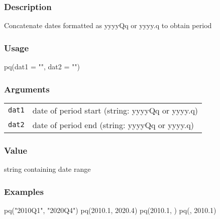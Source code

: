 \documentclass[
  letterpaper,
  DIV=11,
  numbers=noendperiod]{scrreport}
\newenvironment{Shaded}{\begin{snugshade}}{\end{snugshade}}
\newcommand{\AttributeTok}[1]{\textcolor[rgb]{0.40,0.45,0.13}{#1}}
\newcommand{\FloatTok}[1]{\textcolor[rgb]{0.68,0.00,0.00}{#1}}
\newcommand{\FunctionTok}[1]{\textcolor[rgb]{0.28,0.35,0.67}{#1}}
\newcommand{\NormalTok}[1]{\textcolor[rgb]{0.00,0.23,0.31}{#1}}
\newcommand{\StringTok}[1]{\textcolor[rgb]{0.13,0.47,0.30}{#1}}
\begin{document}
\subsubsection{Description}\label{description-21}

Concatenate dates formatted as yyyyQq or yyyy.q to obtain period

\subsubsection{Usage}\label{usage-21}

\begin{Shaded}
\begin{Highlighting}[]
\FunctionTok{pq}\NormalTok{(}\AttributeTok{dat1 =} \StringTok{""}\NormalTok{, }\AttributeTok{dat2 =} \StringTok{""}\NormalTok{)}
\end{Highlighting}
\end{Shaded}

\subsubsection{Arguments}\label{arguments-21}

\begin{longtable}[]{@{}ll@{}}
\toprule\noalign{}
\endhead
\bottomrule\noalign{}
\endlastfoot
\texttt{dat1} & date of period start (string: yyyyQq or yyyy.q) \\
\texttt{dat2} & date of period end (string: yyyyQq or yyyy.q) \\
\end{longtable}

\subsubsection{Value}\label{value-21}

string containing date range

\subsubsection{Examples}\label{examples-21}

\begin{Shaded}
\begin{Highlighting}[]
\FunctionTok{pq}\NormalTok{(}\StringTok{"2010Q1"}\NormalTok{, }\StringTok{"2020Q4"}\NormalTok{)}
\FunctionTok{pq}\NormalTok{(}\FloatTok{2010.1}\NormalTok{, }\FloatTok{2020.4}\NormalTok{)}
\FunctionTok{pq}\NormalTok{(}\FloatTok{2010.1}\NormalTok{, )}
\FunctionTok{pq}\NormalTok{(, }\FloatTok{2010.1}\NormalTok{)}
\end{Highlighting}
\end{Shaded}
\end{document}
